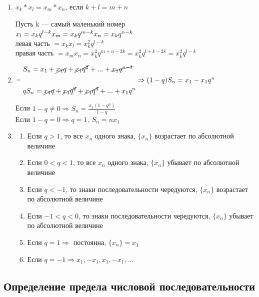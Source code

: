 \documentclass{article}
\begin{document}
\begin{enumerate}
        \item \(x_k * x_l = x_m * x_n\), если \(k+l=m+n\)
        
        Пусть k --- самый маленький номер\\
        \(x_l = x_k q^{l-k}\\
        x_m = x_k q^{m-k}\\
        x_n = x_k q^{n-k}\)\\
        левая часть \(= x_k x_l = x_k^2 q^{l-k}\)\\
        правая часть \(= x_m x_n = x_k^2 q^{m + n - 2k} = x_k^2 q^{l + k - 2k} = x_k^2 q^{l-k}\)
        \item \(\begin{aligned}
        	&\quad S_n = x_1 + \cancel{x_1 q} + \cancel{x_1 q^2} + ... + \cancel{x_1 q^{n-1}}\\
            & -\\
            &\quad q S_n = \cancel{x_1 q} + \cancel{x_1 q^2} + \cancel{x_1 q^3} + ... + x_1 q^n
            \end{aligned} \Rightarrow (1-q)S_n = x_1 - x_1 q^n\)
            
            Если \(1 - q \not = 0 \Rightarrow S_n = \frac{x_1(1-q^n)}{1-q}\)\\
            Если \(1 - q = 0 \Rightarrow q = 1,\ S_n = n x_1\)
        \item \begin{enumerate}
        	\item Если \(q > 1\), то все \(x_n\) одного знака, \(\{x_n\}\) возрастает по абсолютной величине
            \item Если \(0 < q < 1\), то все \(x_n\) одного знака, \(\{x_n\}\) убывает по абсолютной величине
            \item Если \(q < -1\), то знаки последовательности чередуются, \(\{x_n\}\) возрастает по абсолютной величине
            \item Если \(-1 < q < 0\), то знаки последовательности чередуются, \(\{x_n\}\) убывает по абсолютной величине
            \item Если \(q = 1 \Rightarrow\) постоянна, \(\{x_n\} = x_1\)
            \item Если \(q = -1 \Rightarrow x_1, -x_1, x_1, -x_1, ...\)
        \end{enumerate}
    \end{enumerate}
    
    \subsection{Определение предела числовой последовательности}
    
\end{document}
